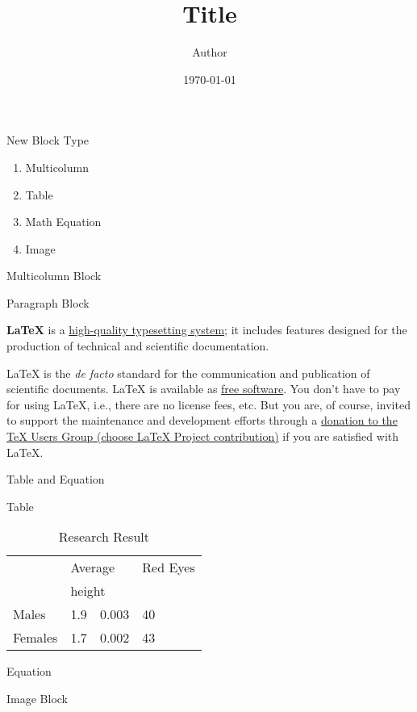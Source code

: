 \documentclass{beamer}
\title{Title}
\author{Author}
\date{\today}
\begin{document}
\maketitle
\begin{frame}{New Block Type}

{
\begin{enumerate}
\item
  Multicolumn
\item
  Table
\item
  Math Equation
\item
  Image
\end{enumerate}
}

\end{frame}
\begin{frame}{Multicolumn Block}

\begin{block}{Paragraph Block}

{
\textbf{LaTeX} is a \underline{high-quality typesetting system}; it
includes features designed for the production of technical and
scientific documentation.
}

\end{block}
\begin{multicols}{2}
LaTeX is the \emph{de facto} standard for the communication and
publication of scientific documents. LaTeX is available as
\href{https://www.latex-project.org/lppl/}{free software}. You don't
have to pay for using LaTeX, i.e., there are no license fees, etc. But
you are, of course, invited to support the maintenance and development
efforts through a \href{https://www.tug.org/donate.html}{donation to the
TeX Users Group (choose LaTeX Project contribution)} if you are
satisfied with LaTeX.

\end{multicols}
\end{frame}
\begin{frame}{Table and Equation}

\begin{alertblock}{Table}

\begin{table}[h]\centering
\begin{tabular}{|l|l|l|l|}\hline
\multirow{2}{*}{}&\multicolumn{2}{|l|}{Average}&Red Eyes\\\cline{2-2}\cline{3-3}\cline{4-4}
\multirow{2}{*}{ }&\multicolumn{2}{|l|}{height}&\\\hline
Males&1.9&0.003&40\\\hline
Females&1.7&0.002&43\\\hline
\end{tabular}
\caption{Research Result}
\end{table}

\end{alertblock}
\begin{exampleblock}{Equation}

\end{exampleblock}
\end{frame}
\begin{frame}{Image Block}

\end{frame}
\end{document}
